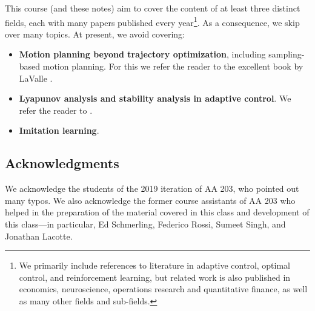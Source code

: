 This course (and these notes) aim to cover the content of at least three distinct fields, each with many papers published every year\footnote{We primarily include references to literature in adaptive control, optimal control, and reinforcement learning, but related work is also published in economics, neuroscience, operations research and quantitative finance, as well as many other fields and sub-fields.}. As a consequence, we skip over many topics. At present, we avoid covering:
\begin{itemize}
    \item \textbf{Motion planning beyond trajectory optimization}, including sampling-based motion planning. For this we refer the reader to the excellent book by LaValle \cite{lavalle2006planning}.
    \item \textbf{Lyapunov analysis and stability analysis in adaptive control}. We refer the reader to \cite{aastrom2013adaptive,ioannou2012robust}.
    \item \textbf{Imitation learning}.
\end{itemize}

\subsection*{Acknowledgments}

We acknowledge the students of the 2019 iteration of AA 203, who pointed out many typos. We also acknowledge the former course assistants of AA 203 who helped in the preparation of the material covered in this class and development of this class---in particular, Ed Schmerling, Federico Rossi, Sumeet Singh, and Jonathan Lacotte. 
